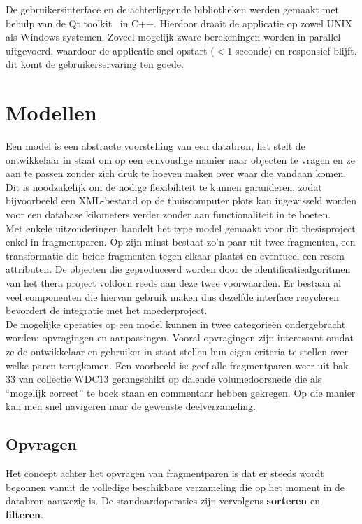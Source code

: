 De gebruikersinterface en de achterliggende bibliotheken werden gemaakt met behulp van de Qt toolkit~\cite{qtdoc} in C++. Hierdoor draait de applicatie op zowel UNIX als Windows systemen. Zoveel mogelijk zware berekeningen worden in parallel uitgevoerd, waardoor de applicatie snel opstart ($<1$ seconde) en responsief blijft, dit komt de gebruikerservaring ten goede.\\

\section{Modellen}
Een model is een abstracte voorstelling van een databron, het stelt de ontwikkelaar in staat om op een eenvoudige manier naar objecten te vragen en ze aan te passen zonder zich druk te hoeven maken over waar die vandaan komen. Dit is noodzakelijk om de nodige flexibiliteit te kunnen garanderen, zodat bijvoorbeeld een XML-bestand op de thuiscomputer plots kan ingewisseld worden voor een database kilometers verder zonder aan functionaliteit in te boeten.\\

Met enkele uitzonderingen handelt het type model gemaakt voor dit thesisproject enkel in fragmentparen. Op zijn minst bestaat zo'n paar uit twee fragmenten, een transformatie die beide fragmenten tegen elkaar plaatst en eventueel een resem attributen. De objecten die geproduceerd worden door de identificatiealgoritmen van het thera project voldoen reeds aan deze twee voorwaarden. Er bestaan al veel componenten die hiervan gebruik maken dus dezelfde interface recycleren bevordert de integratie met het moederproject.\\

De mogelijke operaties op een model kunnen in twee categorie\"en ondergebracht worden: opvragingen en aanpassingen. Vooral opvragingen zijn interessant omdat ze de ontwikkelaar en gebruiker in staat stellen hun eigen criteria te stellen over welke paren terugkomen. Een voorbeeld is: geef alle fragmentparen weer uit bak 33 van collectie WDC13 gerangschikt op dalende volumedoorsnede die als ``mogelijk correct'' te boek staan en commentaar hebben gekregen. Op die manier kan men snel navigeren naar de gewenste deelverzameling.

\subsection{Opvragen}
Het concept achter het opvragen van fragmentparen is dat er steeds wordt begonnen vanuit de volledige beschikbare verzameling die op het moment in de databron aanwezig is. De standaardoperaties zijn vervolgens \textbf{sorteren} en \textbf{filteren}. \\

